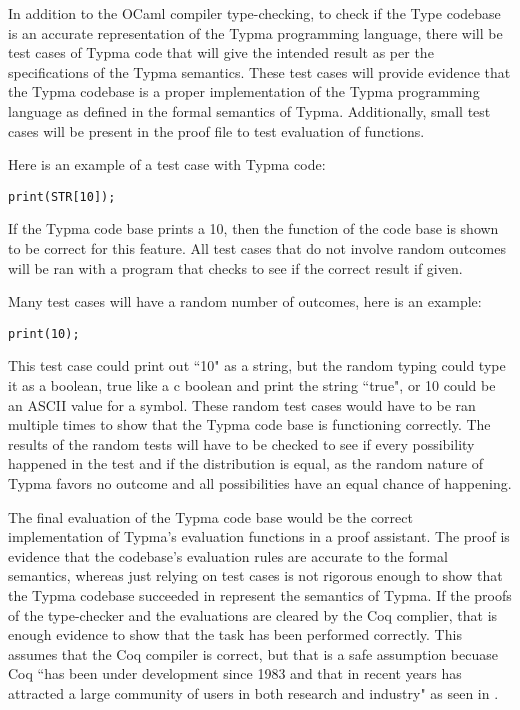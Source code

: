 \documentclass[10pt,twocolumn]{article}
\begin{document}
In addition to the OCaml compiler type-checking, to check if the Type codebase is an accurate representation of the Typma programming language, there will be test cases of Typma code that will give the intended result as per the specifications of the Typma semantics. These test cases will provide evidence that the Typma codebase is a proper implementation of the Typma programming language as defined in the formal semantics of Typma. Additionally, small test cases will be present in the proof file to test evaluation of functions.

Here is an example of a test case with Typma code:

\begin{lstlisting}
print(STR[10]);
\end{lstlisting}

If the Typma code base prints a 10, then the function of the code base is shown to be correct for this feature. All test cases that do not involve random outcomes will be ran with a program that checks to see if the correct result if given.

Many test cases will have a random number of outcomes, here is an example:

\begin{lstlisting}
print(10);
\end{lstlisting}

This test case could print out ``10" as a string, but the random typing could type it as a boolean, true like a c boolean and print the string ``true", or 10 could be an ASCII value for a symbol. These random test cases would have to be ran multiple times to show that the Typma code base is functioning correctly. The results of the random tests will have to be checked to see if every possibility happened in the test and if the distribution is equal, as the random nature of Typma favors no outcome and all possibilities have an equal chance of happening.

The final evaluation of the Typma code base would be the correct implementation of Typma's evaluation functions in a proof assistant. The proof is evidence that the codebase's evaluation rules are accurate to the formal semantics, whereas just relying on test cases is not rigorous enough to show that the Typma codebase succeeded in represent the semantics of Typma. If the proofs of the type-checker and the evaluations are cleared by the Coq complier, that is enough evidence to show that the task has been performed correctly. This assumes that the Coq compiler is correct, but that is a safe assumption becuase Coq ``has been under development since 1983 and that in recent years has attracted a large community of users in both research and industry" as seen in \textcite{Pierce2021Software}.
\end{document}
